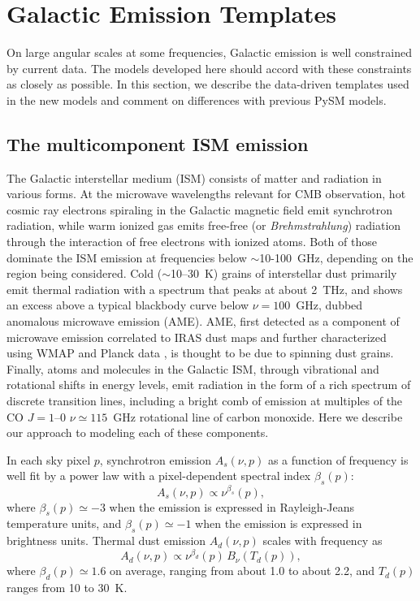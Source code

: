 \section{Galactic Emission Templates} \label{sec:templates}
On large angular scales at some frequencies, Galactic emission is well constrained by current data. The models developed here should accord with these constraints as closely as possible. In this section, we describe the data-driven templates used in the new models and comment on differences with previous PySM models.

\subsection{The multicomponent ISM emission}

The Galactic interstellar medium (ISM) consists of matter and radiation in various forms. At the microwave wavelengths relevant for CMB observation, hot cosmic ray electrons spiraling in the Galactic magnetic field emit synchrotron radiation, while warm ionized gas emits free-free (or \emph{Brehmstrahlung}) radiation through the interaction of free electrons with ionized atoms. Both of those dominate the ISM emission at frequencies below $\sim$10-100~GHz, depending on the region being considered. Cold ($\sim$10--30~K) grains of interstellar dust primarily emit thermal radiation with a spectrum that peaks at about 2~THz, and shows an excess above a typical blackbody curve below $\nu=100$~GHz, dubbed anomalous microwave emission (AME). AME, first detected as a component of microwave emission correlated to IRAS dust maps \citep{1996ApJ...464L...5K,1997ApJ...486L..23L} and further characterized using WMAP and Planck data \citep{planck2011-7.2}, is thought to be due to spinning dust grains. Finally, atoms and molecules in the Galactic ISM, through vibrational and rotational shifts in energy levels, emit radiation in the form of a rich spectrum of discrete transition lines, including a bright comb of emission at multiples of the CO $J=1$--$0$ $\nu \simeq 115$~GHz rotational line of carbon monoxide. Here we describe our approach to modeling each of these components. 

In each sky pixel $p$, synchrotron emission $A_s(\nu,p)$ as a function of frequency is well fit by a power law with a pixel-dependent spectral index $\beta_s(p)$:
\begin{equation}
    A_s(\nu,p) \propto \nu^{\beta_s}(p),
\end{equation}
where $\beta_s(p) \simeq -3$ when the emission is expressed in Rayleigh-Jeans temperature units, and $\beta_s(p) \simeq -1$ when the emission is expressed in brightness units. Thermal dust emission $A_d(\nu,p)$ scales with frequency as
\begin{equation}
    A_d(\nu,p) \propto \nu^{\beta_d}(p) \, B_\nu(T_d(p)),
    \label{eq:dust-emission-law}
\end{equation}
where $\beta_d(p) \simeq 1.6$ on average, ranging from about 1.0 to about 2.2, and $T_d(p)$ ranges from 10 to 30~K.

